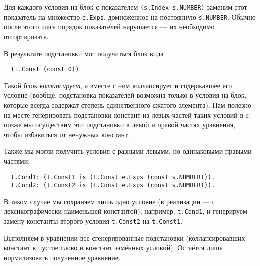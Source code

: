 \documentclass[12pt]{article}
\begin{document}
Для каждого условия на блок с показателем \texttt{(s.Index s.NUMBER)} заменим 
этот показатель на множество \texttt{e.Exps}, домноженное на постоянную
\texttt{s.NUMBER}. Обычно после этого шага порядок показателей нарушается ---
их необходимо отсортировать.

В результате подстановки мог получиться блок вида
\begin{Verbatim}
  (t.Const (const 0))
\end{Verbatim}
Такой блок \textit{коллапсирует}, а вместе с ним коллапсирует и содержавшее
его условие (вообще, подстановка показателей возможна только в условия на блок,
которые всегда содержат степень единственного сжатого элемента). Нам полезно
на месте генерировать подстановки констант из левых частей таких условий в
$\varepsilon$: позже мы осуществим эти подстановки в левой и правой частях
уравнения, чтобы избавиться от ненужных констант.

Также мы могли получить условия с разными левыми, но одинаковыми правыми
частями:
\begin{Verbatim}
  t.Cond1: (t.Const1 is (t.Const e.Exps (const s.NUMBER))),
  t.Cond2: (t.Const2 is (t.Const e.Exps (const s.NUMBER))).
\end{Verbatim}
В таком случае мы сохраняем лишь одно условие (в реализации --- с
лексикографически наименьшей константой), например, \texttt{t.Cond1}, и
генерируем замену константы второго условия \texttt{t.Const2} на
\texttt{t.Const1}.

Выполняем в уравнении все сгенерированные подстановки (коллапсировавших
констант в пустое слово и констант замённых условий). Остаётся лишь
нормализовать полученное уравнение.
\end{document}
